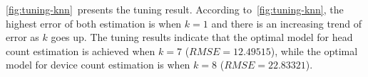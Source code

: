 	\autoref{fig:tuning-knn}~presents the tuning result.
	According to~\autoref{fig:tuning-knn}, the highest error of both estimation is when $k=1$ and there is an increasing trend of error as $k$ goes up.
		The tuning results indicate that the optimal model for head count estimation is achieved when $k=7$ ($RMSE=12.49515$), while the optimal model for device count estimation is when $k=8$ ($RMSE=22.83321$).










